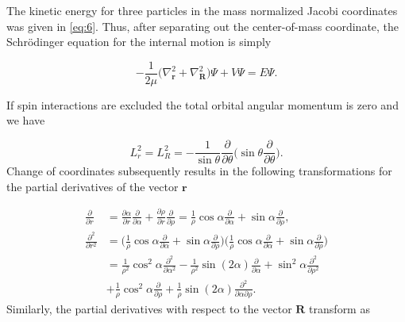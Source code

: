 The kinetic energy for three particles in the mass normalized Jacobi coordinates was given in \eqref{eq:6}. Thus, after separating out the center-of-mass coordinate, the Schr{\"o}dinger equation for the internal motion is simply 

\begin{equation}
-\frac{1}{2\mu} \bigg(\nabla^{2}_{\mathbf{r}} + \nabla^{2}_{\mathbf{R}}\bigg) \Psi + V\Psi = E \Psi. 
\end{equation}

If spin interactions are excluded the total orbital angular momentum is zero and we have 

\begin{equation}
L^{2}_r = L^{2}_{R} = -\frac{1}{\sin{\theta}} \frac{\partial}{\partial{\theta}} \bigg( \sin{\theta} \frac{\partial}{\partial{\theta}} \bigg).
\end{equation}
Change of coordinates subsequently results in the following transformations for the partial derivatives of the vector $\mathbf{r}$

\begin{align}
	\frac{\partial}{\partial r}        &= \frac{\partial\alpha}{\partial r} \frac{\partial}{\partial\alpha} +  \frac{\partial\rho}{\partial r} \frac{\partial}{\partial\rho} = \frac{1}{\rho}\cos{\alpha}\frac{\partial}{\partial \alpha} + \sin{\alpha}\frac{\partial}{\partial \rho}, \\
	\frac{\partial^2}{\partial r^2} &= \bigg( \frac{1}{\rho} \cos\alpha \frac{\partial}{\partial\alpha} + \sin\alpha \frac{\partial}{\partial\rho}\bigg) \bigg( \frac{1}{\rho} \cos\alpha \frac{\partial}{\partial\alpha} + \sin\alpha \frac{\partial}{\partial\rho}\bigg) \nonumber \\
	&= \frac{1}{\rho^2} \cos^2\alpha \frac{\partial^2}{\partial\alpha^{2}} - \frac{1}{\rho^2} \sin(2\alpha) \frac{\partial}{\partial\alpha} + \sin^2\alpha \frac{\partial^2}{\partial\rho^{2}} \nonumber \\
	&+ \frac{1}{\rho} \cos^2\alpha \frac{\partial}{\partial\rho} + \frac{1}{\rho} \sin(2\alpha) \frac{\partial^2}{\partial\alpha \partial\rho}.
\end{align}
Similarly, the partial derivatives with respect to the vector $\mathbf{R}$ transform as

